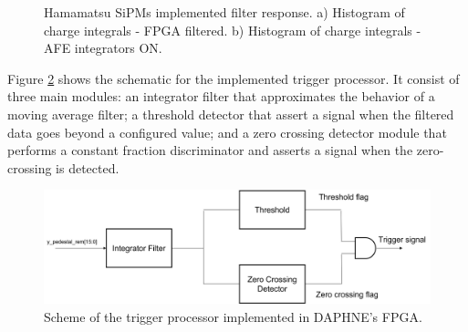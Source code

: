 \begin{figure}[h]
\centering
{}
\caption[]{Hamamatsu SiPMs implemented filter response.  a) Histogram of charge integrals - FPGA filtered. b) Histogram of charge integrals - AFE integrators ON.}
\label{fig:hpk_filt_comp}
\end{figure}

Figure \ref{fig:trigger_processor} shows the schematic for the implemented trigger processor. It consist of three main modules: an integrator filter that approximates the behavior of a moving average filter; a threshold detector that assert a signal when the filtered data goes beyond a configured value; and a zero crossing detector module that performs a constant fraction discriminator and asserts a signal when the zero-crossing is detected. 

\begin{figure}[h]
\centering
\includegraphics[width=120mm]{Images/trigger_processor.png}
\caption[]{Scheme of the trigger processor implemented in DAPHNE's FPGA.}
\label{fig:trigger_processor}
\end{figure}

